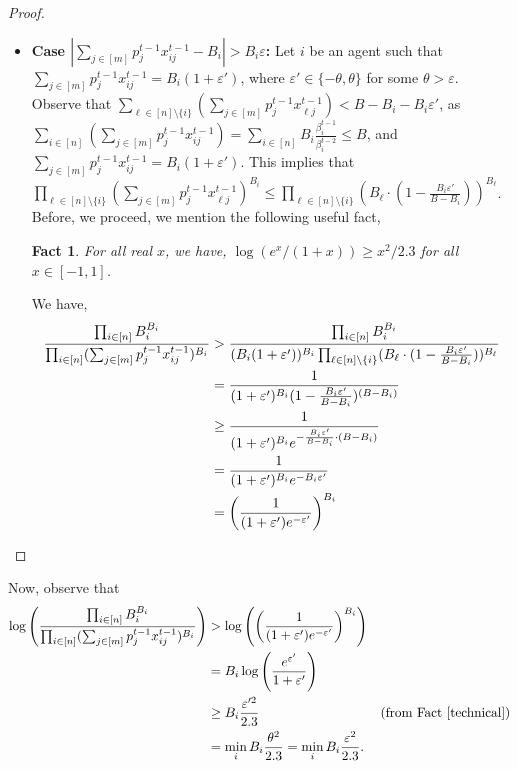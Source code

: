 \documentclass[format=acmsmall,authorversion]{acmart}
\newtheorem{fact}[theorem]{Fact}
\begin{document}
\begin{proof}
\begin{itemize}
      \item \textbf{Case $|\sum_{j \in [m]} p^{t-1}_jx^{t-1}_{ij} - B_i| >  B_i\varepsilon$:}  %
      Let $i$ be an agent such that $\sum_{j \in [m]} p^{t-1}_{j}x^{t-1}_{i j} = B_i(1 + \varepsilon')$, where $\varepsilon' \in \{-\theta, \theta \}$ for some $\theta > \varepsilon$. Observe that $\sum_{\ell \in [n] \setminus \{i\}} (\sum_{j \in [m]} p^{t-1}_jx^{t-1}_{ \ell j}) < B- B_i-B_i\varepsilon'$, as $\sum_{i \in [n]}(\sum_{j \in [m]} p^{t-1}_jx^{t-1}_{ij}) = \sum_{i \in [n]} B_i\frac{\beta^{t-1}_i}{\beta^{t-2}_i} \leq B$, and $\sum_{j \in [m]} p^{t-1}_{j}x^{t-1}_{i j} = B_i(1 + \varepsilon')$. This implies that $\prod_{\ell \in [n] \setminus \{i\}} (\sum_{j \in [m]} p^{t-1}_j x^{t-1}_{ \ell j})^{B_i} \leq \prod_{\ell \in [n] \setminus \{i\}} (B_{\ell} \cdot (1-\frac{B_i\varepsilon'}{B-B_i}))^{B_{\ell}}$. Before, we proceed, we mention the following useful fact,

      \begin{fact}
          \label{technical}
           For all real $x$, we have, $\log(e^x/(1+x)) \geq x^2/2.3$ for all $x \in [-1,1]$.
      \end{fact}
      
      We have,
      \begin{align*}
          \frac{\prod_{i \in [n]} B_i^{B_i}}{\prod_{i \in [n]} (\sum_{j \in [m]} p^{t-1}_j x^{t-1}_{ij})^{B_i}} &> \frac{\prod_{i \in [n]} B_i^{B_i}}{(B_i(1+\varepsilon'))^{B_i} \prod_{\ell \in [n] \setminus \{i\}} (B_{\ell} \cdot (1 - \frac{B_i\varepsilon'}{B-B_i}))^{B_{\ell}}}\\
                                                                    &=\frac{1}{(1 + \varepsilon')^{B_i} (1-\frac{B_i\varepsilon'}{B-B_i})^{(B-B_i)}}\\
                                                                    &\geq \frac{1}{(1 + \varepsilon')^{B_i} e^{-\frac{B_i\varepsilon'}{B-B_i} \cdot (B-B_i)}}\\        &= \frac{1}{(1 + \varepsilon')^{B_i}e^{-B_i\varepsilon'}}\\
                                                                    &=\bigg( \frac{1}{(1+\varepsilon')e^{-\varepsilon'}} \bigg)^{B_i} \qedhere
      \end{align*}
   \end{itemize}
\end{proof}
Now, observe that \
\begin{align*}
     \log \Bigg( \frac{\prod_{i \in [n]} B_i^{B_i}}{\prod_{i \in [n]} (\sum_{j \in [m]} p^{t-1}_j x^{t-1}_{ij})^{B_i}} \Bigg) &> \log \Bigg( \bigg(\frac{1}{(1+\varepsilon')e^{-\varepsilon'}}\bigg)^{B_i} \Bigg)\\
     &=B_i \log \Bigg(\frac{e^{\varepsilon'}}{1+\varepsilon'} \Bigg)\\
     &\geq B_i \frac{\varepsilon'^2}{2.3} &\text{(from Fact~\ref{technical})}\\
     &= \min_i B_i \frac{\theta^2}{2.3} = \min_i B_i \frac{\varepsilon^2}{2.3}. 
\end{align*}
\end{document}
